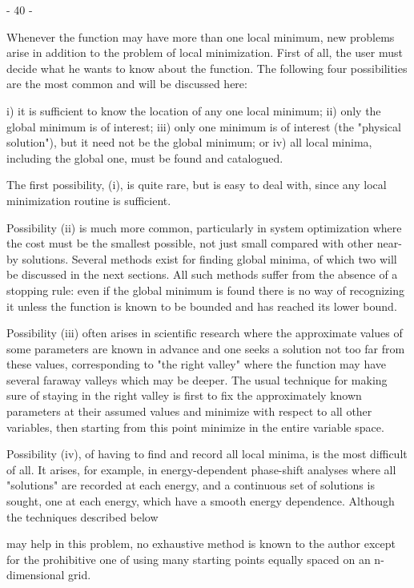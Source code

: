  
                                 - 40 -
 
 
     Whenever the function may have more than one local minimum, new
problems arise in addition to the problem  of local minimization. First
of all, the user must decide what he wants to know about the function.
The following four possibilities are the most common and will be
discussed here:
 
  i) it is sufficient to know the location of any one local minimum;
 ii) only the global minimum is of interest;
 iii) only one minimum is of interest (the "physical solution"), but it
 need not be the global minimum; or
 iv) all local minima, including the global one, must be found and
 catalogued.
 
     The first possibility, (i), is quite rare, but is easy to deal with,
since any local minimization routine is sufficient.
 
     Possibility (ii) is much more common, particularly in system
optimization where the cost must be the smallest possible, not just
small compared with other near-by solutions.  Several methods exist for
finding global minima, of which two will be discussed in the next sections.
 All such methods suffer from the absence of a stopping rule:
even if the global minimum is found there is no way of recognizing it
unless the function is known to be bounded and has reached its lower
bound.
 
     Possibility (iii) often arises in scientific research where the
approximate values of some parameters are known in advance and one seeks
a solution not too far from these values, corresponding to "the right
valley" where the function may have several faraway valleys which may
be deeper.  The usual technique for making sure of staying in the right
valley is first to fix the approximately known parameters at their
assumed values and minimize with respect to all other variables, then
starting from this point minimize in the entire variable space.
 
     Possibility (iv), of having to find and record all local minima,
is the most difficult of all.  It arises, for example, in energy-dependent
phase-shift analyses where all "solutions" are recorded at each energy,
and a continuous set of solutions is sought, one at each energy, which
have a smooth energy dependence. Although the techniques described below
 
 
 
 
may help in this problem, no exhaustive method is known to the author
except for the prohibitive one of using many starting points equally
spaced on an n-dimensional grid.
 
